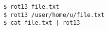 \begin{lstlisting}[caption=Examples of how a user will interact with the utility from the console]
$ rot13 file.txt
$ rot13 /user/home/u/file.txt
$ cat file.txt | rot13
\end{lstlisting}
